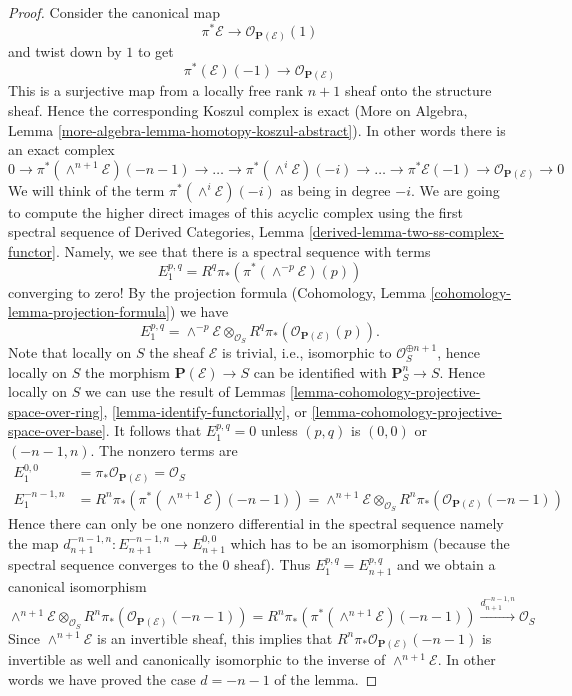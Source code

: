 \begin{proof}
Consider the canonical map
$$
\pi^*\mathcal{E} \longrightarrow \mathcal{O}_{\mathbf{P}(\mathcal{E})}(1)
$$
and twist down by $1$ to get
$$
\pi^*(\mathcal{E})(-1) \longrightarrow \mathcal{O}_{\mathbf{P}(\mathcal{E})}
$$
This is a surjective map from a locally free rank $n + 1$ sheaf onto
the structure sheaf. Hence the corresponding Koszul complex is
exact (More on Algebra, Lemma
\ref{more-algebra-lemma-homotopy-koszul-abstract}).
In other words there is an exact complex
$$
0 \to
\pi^*(\wedge^{n + 1}\mathcal{E})(-n - 1) \to
\ldots \to
\pi^*(\wedge^i\mathcal{E})(-i) \to
\ldots \to
\pi^*\mathcal{E}(-1) \to
\mathcal{O}_{\mathbf{P}(\mathcal{E})} \to 0
$$
We will think of the term $\pi^*(\wedge^i\mathcal{E})(-i)$ as being
in degree $-i$.
We are going to compute the higher direct images
of this acyclic complex using the first spectral sequence of
Derived Categories, Lemma \ref{derived-lemma-two-ss-complex-functor}.
Namely, we see that there is a spectral sequence with terms
$$
E_1^{p, q} = R^q\pi_*\left(\pi^*(\wedge^{-p}\mathcal{E})(p)\right)
$$
converging to zero! By the projection formula
(Cohomology, Lemma \ref{cohomology-lemma-projection-formula})
we have
$$
E_1^{p, q} = \wedge^{-p} \mathcal{E} \otimes_{\mathcal{O}_S}
R^q\pi_*\left(\mathcal{O}_{\mathbf{P}(\mathcal{E})}(p)\right).
$$
Note that locally on $S$ the sheaf $\mathcal{E}$ is trivial,
i.e., isomorphic to $\mathcal{O}_S^{\oplus n + 1}$, hence locally on
$S$ the morphism $\mathbf{P}(\mathcal{E}) \to S$ can be identified
with $\mathbf{P}^n_S \to S$. Hence
locally on $S$ we can use the result of Lemmas
\ref{lemma-cohomology-projective-space-over-ring},
\ref{lemma-identify-functorially}, or
\ref{lemma-cohomology-projective-space-over-base}.
It follows that $E_1^{p, q} = 0$ unless $(p, q)$ is $(0, 0)$
or $(-n - 1, n)$. The nonzero terms are
\begin{align*}
E_1^{0, 0} & = \pi_*\mathcal{O}_{\mathbf{P}(\mathcal{E})} = \mathcal{O}_S \\
E_1^{-n - 1, n} & =
R^n\pi_*\left(\pi^*(\wedge^{n + 1}\mathcal{E})(-n - 1)\right) =
\wedge^{n + 1}\mathcal{E} \otimes_{\mathcal{O}_S}
R^n\pi_*\left(\mathcal{O}_{\mathbf{P}(\mathcal{E})}(-n - 1)\right)
\end{align*}
Hence there can only be one nonzero
differential in the spectral sequence namely the map
$d_{n + 1}^{-n - 1, n} : E_{n + 1}^{-n - 1, n} \to E_{n + 1}^{0, 0}$
which has to be an isomorphism (because the spectral sequence converges
to the $0$ sheaf). Thus $E_1^{p, q} = E_{n + 1}^{p, q}$ and
we obtain a canonical isomorphism
$$
\wedge^{n + 1}\mathcal{E} \otimes_{\mathcal{O}_S}
R^n\pi_*\left(\mathcal{O}_{\mathbf{P}(\mathcal{E})}(-n - 1)\right) =
R^n\pi_*\left(\pi^*(\wedge^{n + 1}\mathcal{E})(-n - 1)\right)
\xrightarrow{d_{n + 1}^{-n - 1, n}}
\mathcal{O}_S
$$
Since $\wedge^{n + 1}\mathcal{E}$ is an invertible
sheaf, this implies that
$R^n\pi_*\mathcal{O}_{\mathbf{P}(\mathcal{E})}(-n - 1)$ is invertible
as well and canonically isomorphic to the inverse of
$\wedge^{n + 1}\mathcal{E}$. In other words we have proved the case
$d = - n - 1$ of the lemma.


\end{proof}
